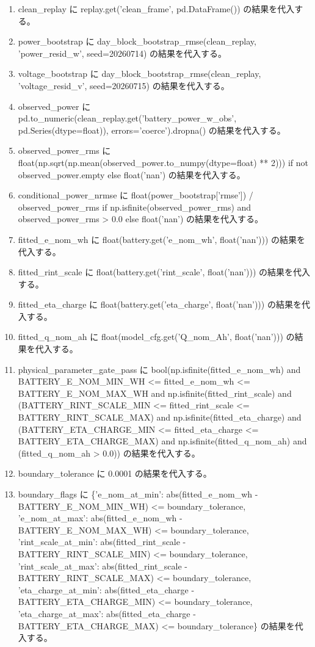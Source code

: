 \documentclass[a4paper,11pt]{article}
\begin{document}
\begin{enumerate}[leftmargin=1.8em]
\item clean\_replay に replay.get('clean\_frame', pd.DataFrame()) の結果を代入する。
\item power\_bootstrap に day\_block\_bootstrap\_rmse(clean\_replay, 'power\_resid\_w', seed=20260714) の結果を代入する。
\item voltage\_bootstrap に day\_block\_bootstrap\_rmse(clean\_replay, 'voltage\_resid\_v', seed=20260715) の結果を代入する。
\item observed\_power に pd.to\_numeric(clean\_replay.get('battery\_power\_w\_obs', pd.Series(dtype=float)), errors='coerce').dropna() の結果を代入する。
\item observed\_power\_rms に float(np.sqrt(np.mean(observed\_power.to\_numpy(dtype=float) ** 2))) if not observed\_power.empty else float('nan') の結果を代入する。
\item conditional\_power\_nrmse に float(power\_bootstrap['rmse']) / observed\_power\_rms if np.isfinite(observed\_power\_rms) and observed\_power\_rms > 0.0 else float('nan') の結果を代入する。
\item fitted\_e\_nom\_wh に float(battery.get('e\_nom\_wh', float('nan'))) の結果を代入する。
\item fitted\_rint\_scale に float(battery.get('rint\_scale', float('nan'))) の結果を代入する。
\item fitted\_eta\_charge に float(battery.get('eta\_charge', float('nan'))) の結果を代入する。
\item fitted\_q\_nom\_ah に float(model\_cfg.get('Q\_nom\_Ah', float('nan'))) の結果を代入する。
\item physical\_parameter\_gate\_pass に bool(np.isfinite(fitted\_e\_nom\_wh) and BATTERY\_E\_NOM\_MIN\_WH <= fitted\_e\_nom\_wh <= BATTERY\_E\_NOM\_MAX\_WH and np.isfinite(fitted\_rint\_scale) and (BATTERY\_RINT\_SCALE\_MIN <= fitted\_rint\_scale <= BATTERY\_RINT\_SCALE\_MAX) and np.isfinite(fitted\_eta\_charge) and (BATTERY\_ETA\_CHARGE\_MIN <= fitted\_eta\_charge <= BATTERY\_ETA\_CHARGE\_MAX) and np.isfinite(fitted\_q\_nom\_ah) and (fitted\_q\_nom\_ah > 0.0)) の結果を代入する。
\item boundary\_tolerance に 0.0001 の結果を代入する。
\item boundary\_flags に \{'e\_nom\_at\_min': abs(fitted\_e\_nom\_wh - BATTERY\_E\_NOM\_MIN\_WH) <= boundary\_tolerance, 'e\_nom\_at\_max': abs(fitted\_e\_nom\_wh - BATTERY\_E\_NOM\_MAX\_WH) <= boundary\_tolerance, 'rint\_scale\_at\_min': abs(fitted\_rint\_scale - BATTERY\_RINT\_SCALE\_MIN) <= boundary\_tolerance, 'rint\_scale\_at\_max': abs(fitted\_rint\_scale - BATTERY\_RINT\_SCALE\_MAX) <= boundary\_tolerance, 'eta\_charge\_at\_min': abs(fitted\_eta\_charge - BATTERY\_ETA\_CHARGE\_MIN) <= boundary\_tolerance, 'eta\_charge\_at\_max': abs(fitted\_eta\_charge - BATTERY\_ETA\_CHARGE\_MAX) <= boundary\_tolerance\} の結果を代入する。

\end{enumerate}
\end{document}
